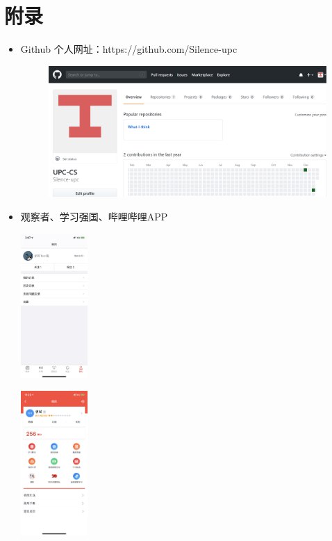 \documentclass{article}
\begin{document}
\section{附录}
\begin{itemize}
    \item Github
    个人网址：https://github.com/Silence-upc\par
    \begin{figure}[h!]
    	\centering
    	\includegraphics[scale=0.22]{Github}
    	\label{fig:github}
    \end{figure}
    \item 观察者、学习强国、哔哩哔哩APP\par
  \begin{minipage}[t]{0.33\linewidth}
  	\centering
  	\includegraphics[width=1in]{gcz}
  \end{minipage}
  \begin{minipage}[t]{0.33\linewidth}
	\centering
	\includegraphics[width=1in]{xxqg}

\end{minipage}
\end{itemize}
\end{document}
